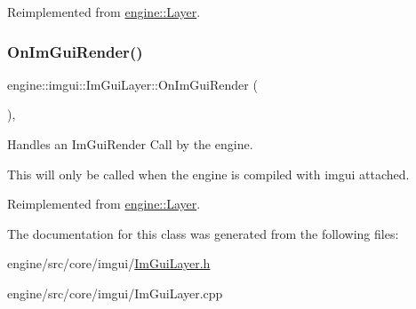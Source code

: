 Reimplemented from \hyperlink{classengine_1_1Layer}{engine\+::\+Layer}.

\mbox{\label{classengine_1_1imgui_1_1ImGuiLayer_aeacc4aecfc119192fbe98e961b88813e}} 
\subsubsection{\texorpdfstring{On\+Im\+Gui\+Render()}{OnImGuiRender()}}
{\footnotesize\ttfamily engine\+::imgui\+::\+Im\+Gui\+Layer\+::\+On\+Im\+Gui\+Render (\begin{DoxyParamCaption}{ }\end{DoxyParamCaption})\hspace{0.3cm}{\ttfamily [override]}, {\ttfamily [virtual]}}



Handles an Im\+Gui\+Render Call by the engine. 

This will only be called when the engine is compiled with imgui attached. 

Reimplemented from \hyperlink{classengine_1_1Layer}{engine\+::\+Layer}.



The documentation for this class was generated from the following files\+:\begin{DoxyCompactItemize}
\item 
engine/src/core/imgui/\hyperlink{ImGuiLayer_8h}{Im\+Gui\+Layer.\+h}\item 
engine/src/core/imgui/Im\+Gui\+Layer.\+cpp\end{DoxyCompactItemize}

